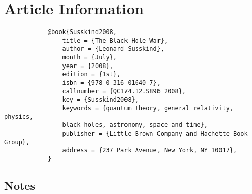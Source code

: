 \documentclass[10pt]{article}
\newcommand{\atitle}[1]{\renewcommand{\atitle}{#1}}
\newcommand{\acitation}[1]{\renewcommand{\acitation}{#1}}
\begin{document}
\section*{Article Information}
\atitle{The Black Hole War}
\acitation{Susskind2008}

	\begin{framed}
		\begin{verbatim}
            @book{Susskind2008,
                title = {The Black Hole War},
                author = {Leonard Susskind},
                month = {July},
                year = {2008},
                edition = {1st},
                isbn = {978-0-316-01640-7},
                callnumber = {QC174.12.S896 2008},
                key = {Susskind2008},
                keywords = {quantum theory, general relativity, physics, 
                black holes, astronomy, space and time},
                publisher = {Little Brown Company and Hachette Book Group},
                address = {237 Park Avenue, New York, NY 10017},
            }
		\end{verbatim}
	\end{framed}


\begin{multicols}{2}

\section*{Notes}



\nocite{*}


\end{multicols}
\end{document}
